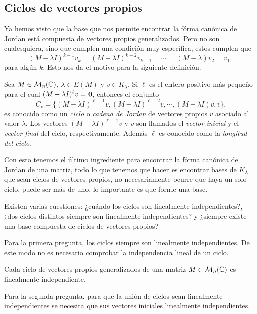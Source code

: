\subsection{Ciclos de vectores propios}

Ya hemos visto que la base que nos permite encontrar la fórma canónica de Jordan está compuesta de vectores propios generalizados. Pero no son cualesquiera, sino que cumplen una condición muy específica, estos cumplen que 
\[
  (M-\lambda I)^{k-1}v_k = (M-\lambda I)^{k-2}v_{k-1} = \cdots = (M-\lambda)v_2 = v_1,
\]
para algún $k$. Esto nos da el motivo para la siguiente definición.

\begin{defi}
  Sea $M \in \mathcal{M}_n(\mathbb{C})$, $\lambda \in E(M)$ y $v \in K_\lambda$. Si $\ell$ es el entero positivo más pequeño para el cual $(M-\lambda I)^\ell v = \mathbf{0}$, entonces el conjunto
    \[
      C_v = \{ (M-\lambda I)^{\ell-1}v, (M-\lambda I)^{\ell-2}v, \cdots, (M-\lambda I)v, v \}.
    \]
  es conocido como un \emph{ciclo} o \emph{cadena de Jordan} de vectores propios  $v$ asociado al valor $\lambda$.  Los vectores $(M-\lambda I)^{\ell-1}v$ y $v$ son llamados el \emph{vector inicial} y el \emph{vector final} del ciclo, respectivamente. Además $\ell$ es conocido como la \emph{longitud del ciclo}.
\end{defi}

Con esto tenemos el último ingrediente para encontrar la fórma canónica de Jordan de una matriz, todo lo que tenemos que hacer es encontrar bases de $K_\lambda$ que sean ciclos de vectores propios, no necesariamente ocurre que haya un solo ciclo, puede ser más de uno, lo importante es que forme una base.

Existen varias cuestiones: ¿cuándo los ciclos son linealmente independientes?, ¿dos ciclos distintos siempre son linealmente independientes? y ¿siempre existe una base compuesta de ciclos de vectores propios? 

Para la primera pregunta, los ciclos siempre son linealmente independientes. De este modo no es necesario comprobar la independencia lineal de un ciclo.

\begin{teor}
  Cada ciclo de vectores propios generalizados de una matriz $M\in\mathcal{M}_n(\mathbb{C})$ es linealmente independiente.
\end{teor}

Para la segunda pregunta, para que la unión de ciclos sean linealmente independientes se necesita que sus vectores iniciales linealmente independientes.

